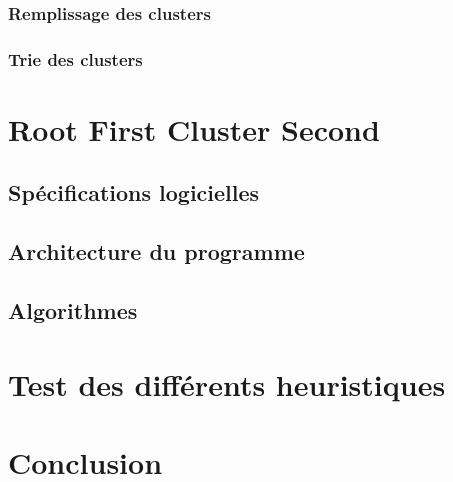 \documentclass[twoside,UTF8]{EPURapport}
\begin{document}
\subsection{Remplissage des clusters}



\subsection{Trie des clusters}


\chapter{Root First Cluster Second}

\section{Spécifications logicielles}

\section{Architecture du programme}

\section{Algorithmes}



\chapter{Test des différents heuristiques}
\label{chap:test}

\chapter{Conclusion}

\end{document}
